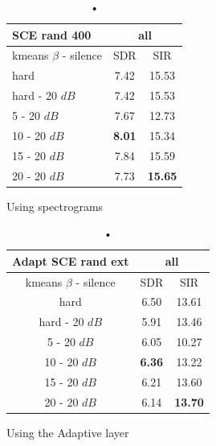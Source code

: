 \documentclass[master, tikz, final,11pt, dvipdfmx]{iscs-thesis}
\begin{document}
\begin{table}[h!]
\begin{subtable}{.5\linewidth}
\centering
\begin{tabular}{l|c|c}
SCE rand 400 & \multicolumn{2}{c}{all} \\  
\hline 
kmeans $\beta$ - silence & SDR & SIR  \\ 
\hline
hard  & 7.42 & 15.53  \\ 
hard - 20 $dB$  & 7.42 & 15.53 \\
\hline
\hline
5 - 20 $dB$  & 7.67 & 12.73 \\ 
10 - 20 $dB$  & \cellcolor{green}\textbf{8.01} & \cellcolor{green}15.34 \\ 
15 - 20 $dB$ & 7.84 & 15.59  \\ 
20 - 20 $dB$ & 7.73 & \textbf{15.65}  \\ 
\end{tabular}
\captionsetup{justification=centering}
\caption{Using spectrograms}
\label{table:SCErand400}
\end{subtable}%
\begin{subtable}{.5\linewidth}
\centering
\begin{tabular}{c|c|c}
Adapt SCE rand ext & \multicolumn{2}{c}{all} \\  
\hline 
kmeans $\beta$ - silence & SDR & SIR  \\ 
\hline
hard  & 6.50 & 13.61  \\ 
hard - 20 $dB$  & 5.91 & 13.46 \\
\hline
\hline
5 - 20 $dB$  & 6.05 & 10.27 \\ 
10 - 20 $dB$  & \cellcolor{green}\textbf{6.36} & \cellcolor{green}13.22 \\ 
15 - 20 $dB$ & 6.21 & 13.60  \\ 
20 - 20 $dB$ & 6.14 & \textbf{13.70}  \\ 
\end{tabular}
\caption{Using the Adaptive layer}
\label{table:AdaptSCErand400}
\end{subtable}
\caption{•}
\end{table}
\end{document}
